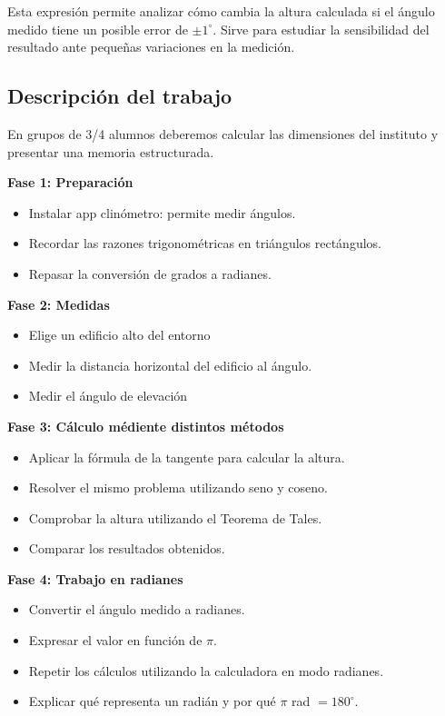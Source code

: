 \documentclass[a4paper,12pt]{extarticle}
\begin{document}
    Esta expresión permite analizar cómo cambia la altura calculada si el ángulo medido tiene un posible error de \(\pm1^\circ\). Sirve para estudiar la sensibilidad del resultado ante pequeñas variaciones en la medición.

    \subsection*{Descripción del trabajo}
        En grupos de 3/4 alumnos deberemos calcular las dimensiones del instituto y presentar una memoria estructurada.



        \textbf{Fase 1: Preparación}
            \begin{itemize}
                \item Instalar app clinómetro: permite medir ángulos.
                \item Recordar las razones trigonométricas en triángulos rectángulos.
                \item Repasar la conversión de grados a radianes.
            \end{itemize}

        \textbf{Fase 2: Medidas}
            \begin{itemize}
                \item Elige un edificio alto del  entorno
                \item Medir la distancia horizontal del edificio al ángulo.
                \item Medir el ángulo de elevación
            \end{itemize}

        \textbf{Fase 3: Cálculo médiente distintos métodos}
            \begin{itemize}
                \item Aplicar la fórmula de la tangente para calcular la altura.
                \item Resolver el mismo problema utilizando seno y coseno.
                \item Comprobar la altura utilizando el Teorema de Tales.
                \item Comparar los resultados obtenidos.
            \end{itemize}

        \textbf{Fase 4: Trabajo en radianes}

            \begin{itemize}
                \item Convertir el ángulo medido a radianes.
                \item Expresar el valor en función de $\pi$.
                \item Repetir los cálculos utilizando la calculadora en modo radianes.
                \item Explicar qué representa un radián y por qué $\pi$ rad $= 180^\circ$.
            \end{itemize}
\end{document}
